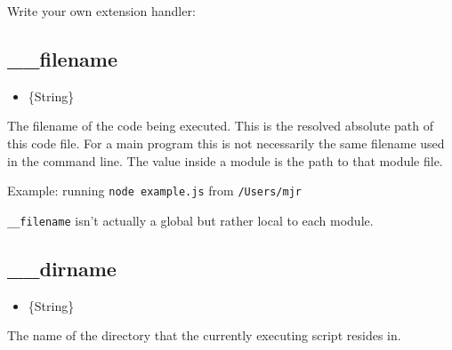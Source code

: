 Write your own extension handler:

\begin{Shaded}
\begin{Highlighting}[]
\NormalTok{[}\NormalTok{] = }
   \NormalTok{);}
   
\NormalTok{\};}
\end{Highlighting}
\end{Shaded}

\subsection{\_\_filename}

\begin{itemize}
\item
  \{String\}
\end{itemize}

The filename of the code being executed. This is the resolved absolute
path of this code file. For a main program this is not necessarily the
same filename used in the command line. The value inside a module is the
path to that module file.

Example: running \texttt{node example.js} from \texttt{/Users/mjr}

\begin{Shaded}
\begin{Highlighting}[]
\end{Highlighting}
\end{Shaded}

\texttt{\_\_filename} isn't actually a global but rather local to each
module.

\subsection{\_\_dirname}

\begin{itemize}
\item
  \{String\}
\end{itemize}

The name of the directory that the currently executing script resides
in.

